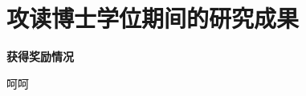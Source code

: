 ﻿\chapter{攻读博士学位期间的研究成果}

\begin{refsection}

\nocite{周林2012IJA,万振华2012QD}

\printbibliography[heading=subbibliography,title={已接收或已发表的论文}]
\end{refsection}


\begin{refsection}

\nocite{周林1,周林2}

\printbibliography[heading=subbibliography,title={准备投递的文章}]
\end{refsection}

\vspace{8pt}%

\begin{flushleft}
\sanhao\textbf{获得奖励情况}
\end{flushleft}
呵呵~~
